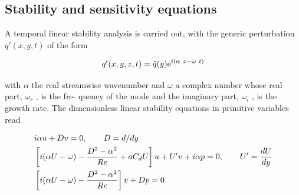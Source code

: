\subsection{Stability and sensitivity equations}
\label{sec2b}
A temporal linear stability analysis is carried out, with the generic perturbation $q'(x, y,t)$ of the
form

\begin{equation}
q'(x,y,z,t)=\tilde q(y){\rm e}^{i(\alpha \  x -\omega \ t)}
\label{eq:q}
\end{equation}

with $\alpha$ the real streamwise wavenumber and $\omega$ a complex number whose real part, $\omega_r$ , is the fre-
quency of the mode and the imaginary part, $\omega_i$ , is the growth rate. The dimensionless linear stability
equations in primitive variables read

\begin{equation}
\begin{split}
& i\alpha u + D v =0,  \qquad D=d/dy \vspace{0.3cm}\\
& \left [ i (\alpha U -\omega)   - \frac{D^2-\alpha^2}{Re}+ a C_d U \right] u + U' v + i \alpha p  = 0,  \qquad U'=\dfrac{d U}{dy} \vspace{0.3cm} \\
& \left[ i (\alpha U -\omega)   - \frac{D^2-\alpha^2}{Re} \right ] v + D p   = 0
\label{eq:uvp}
\end{split}
\end{equation}


